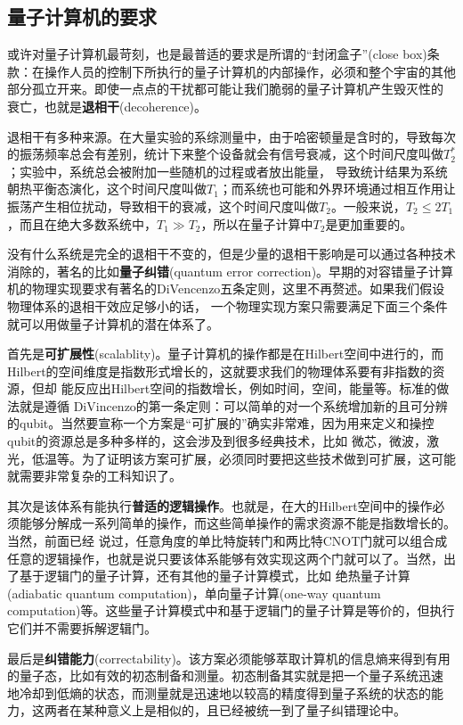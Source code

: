   \subsection{量子计算机的要求}

或许对量子计算机最苛刻，也是最普适的要求是所谓的“封闭盒子”(close box)条款：在操作人员的控制下所执行的量子计算机的内部操作，必须和整个宇宙的其他部分孤立开来。即使一点点的干扰都可能让我们脆弱的量子计算机产生毁灭性的
衰亡，也就是\textbf{退相干}(decoherence)。

退相干有多种来源。在大量实验的系综测量中，由于哈密顿量是含时的，导致每次的振荡频率总会有差别，统计下来整个设备就会有信号衰减，这个时间尺度叫做$T_2^{\ast}$；实验中，系统总会被附加一些随机的过程或者放出能量，
导致统计结果为系统朝热平衡态演化，这个时间尺度叫做$T_1$；而系统也可能和外界环境通过相互作用让振荡产生相位扰动，导致相干的衰减，这个时间尺度叫做$T_2$。一般来说，$T_2\leq 2T_1$，而且在绝大多数系统中，$T_1 \gg T_2$，所以在量子计算中$T_2$是更加重要的。

没有什么系统是完全的退相干不变的，但是少量的退相干影响是可以通过各种技术消除的，著名的比如\textbf{量子纠错}(quantum error correction)。早期的对容错量子计算机的物理实现要求有著名的DiVencenzo五条定则\cite{DiVincenzo5}，这里不再赘述。如果我们假设物理体系的退相干效应足够小的话， 一个物理实现方案只需要满足下面三个条件就可以用做量子计算机的潜在体系了。

首先是\textbf{可扩展性}(scalablity)。量子计算机的操作都是在Hilbert空间中进行的，而Hilbert的空间维度是指数形式增长的，这就要求我们的物理体系要有非指数的资源，但却
能反应出Hilbert空间的指数增长，例如时间，空间，能量等。标准的做法就是遵循 DiVincenzo的第一条定则：可以简单的对一个系统增加新的且可分辨的qubit。当然要宣称一个方案是“可扩展的”确实非常难，因为用来定义和操控qubit的资源总是多种多样的，这会涉及到很多经典技术，比如
微芯，微波，激光，低温等。为了证明该方案可扩展，必须同时要把这些技术做到可扩展，这可能就需要非常复杂的工科知识了。

其次是该体系有能执行\textbf{普适的逻辑操作}。也就是，在大的Hilbert空间中的操作必须能够分解成一系列简单的操作，而这些简单操作的需求资源不能是指数增长的。当然，前面已经
说过，任意角度的单比特旋转门和两比特CNOT门就可以组合成任意的逻辑操作，也就是说只要该体系能够有效实现这两个门就可以了。当然，出了基于逻辑门的量子计算，还有其他的量子计算模式，比如
绝热量子计算(adiabatic quantum computation)\cite{adia1}，单向量子计算(one-way quantum computation)\cite{oneway1}等。这些量子计算模式中和基于逻辑门的量子计算是等价的，但执行它们并不需要拆解逻辑门。

最后是\textbf{纠错能力}(correctability)。该方案必须能够萃取计算机的信息熵来得到有用的量子态，比如有效的初态制备和测量。初态制备其实就是把一个量子系统迅速
地冷却到低熵的状态，而测量就是迅速地以较高的精度得到量子系统的状态的能力，这两者在某种意义上是相似的，且已经被统一到了量子纠错理论中。


